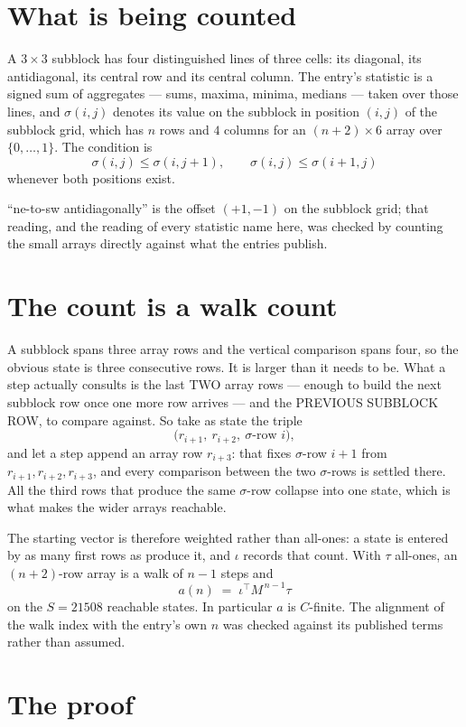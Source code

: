 \documentclass[11pt,a4paper]{article}
\theoremstyle{plain}
\theoremstyle{definition}
\begin{document}
\section{What is being counted}

A $3\times3$ subblock has four distinguished lines of three cells: its diagonal, its
antidiagonal, its central row and its central column. The entry's statistic is a signed sum of
aggregates --- sums, maxima, minima, medians --- taken over those lines, and $\sigma(i,j)$
denotes its value on the subblock in position $(i,j)$ of the subblock grid, which has $n$ rows
and $4$ columns for an $(n+2)\times6$ array over $\{0,\dots,1\}$. The condition is
\[
\sigma(i,j)\le\sigma(i,j+1),\qquad \sigma(i,j)\le\sigma(i+1,j)
\]
whenever both positions exist.

``ne-to-sw antidiagonally'' is the offset $(+1,-1)$ on the subblock grid; that reading, and
the reading of every statistic name here, was checked by counting the small arrays directly
against what the entries publish.

\section{The count is a walk count}

A subblock spans three array rows and the vertical comparison spans four, so the obvious state
is three consecutive rows. It is larger than it needs to be. What a step actually consults is
the last TWO array rows --- enough to build the next subblock row once one more row arrives ---
and the PREVIOUS SUBBLOCK ROW, to compare against. So take as state the triple
\[
\bigl(r_{i+1},\ r_{i+2},\ \sigma\text{-row }i\bigr),
\]
and let a step append an array row $r_{i+3}$: that fixes $\sigma$-row $i+1$ from
$r_{i+1},r_{i+2},r_{i+3}$, and every comparison between the two $\sigma$-rows is settled
there. All the third rows that produce the same $\sigma$-row collapse into one state, which is
what makes the wider arrays reachable.

The starting vector is therefore weighted rather than all-ones: a state is entered by as many
first rows as produce it, and $\iota$ records that count. With $\tau$ all-ones, an
$(n+2)$-row array is a walk of $n-1$ steps and
\[
a(n)\;=\;\iota^{\!\top}M^{\,n-1}\tau
\]
on the $S=21508$ reachable states. In particular $a$ is $C$-finite. The alignment of the walk
index with the entry's own $n$ was checked against its published terms rather than assumed.

\section{The proof}
\end{document}
